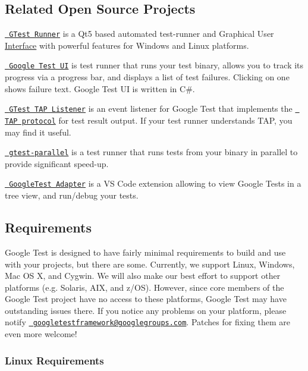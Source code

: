\subsection*{Related Open Source Projects}

\href{https://github.com/nholthaus/gtest-runner}{\texttt{ G\+Test Runner}} is a Qt5 based automated test-\/runner and Graphical User \mbox{\hyperlink{class_interface}{Interface}} with powerful features for Windows and Linux platforms.

\href{https://github.com/ospector/gtest-gbar}{\texttt{ Google Test UI}} is test runner that runs your test binary, allows you to track its progress via a progress bar, and displays a list of test failures. Clicking on one shows failure text. Google Test UI is written in C\#.

\href{https://github.com/kinow/gtest-tap-listener}{\texttt{ G\+Test T\+AP Listener}} is an event listener for Google Test that implements the \href{https://en.wikipedia.org/wiki/Test_Anything_Protocol}{\texttt{ T\+AP protocol}} for test result output. If your test runner understands T\+AP, you may find it useful.

\href{https://github.com/google/gtest-parallel}{\texttt{ gtest-\/parallel}} is a test runner that runs tests from your binary in parallel to provide significant speed-\/up.

\href{https://marketplace.visualstudio.com/items?itemName=DavidSchuldenfrei.gtest-adapter}{\texttt{ Google\+Test Adapter}} is a VS Code extension allowing to view Google Tests in a tree view, and run/debug your tests.

\subsection*{Requirements}

Google Test is designed to have fairly minimal requirements to build and use with your projects, but there are some. Currently, we support Linux, Windows, Mac OS X, and Cygwin. We will also make our best effort to support other platforms (e.\+g. Solaris, A\+IX, and z/\+OS). However, since core members of the Google Test project have no access to these platforms, Google Test may have outstanding issues there. If you notice any problems on your platform, please notify \href{https://groups.google.com/forum/\#!forum/googletestframework}{\texttt{ googletestframework@googlegroups.\+com}}. Patches for fixing them are even more welcome!

\subsubsection*{Linux Requirements}

